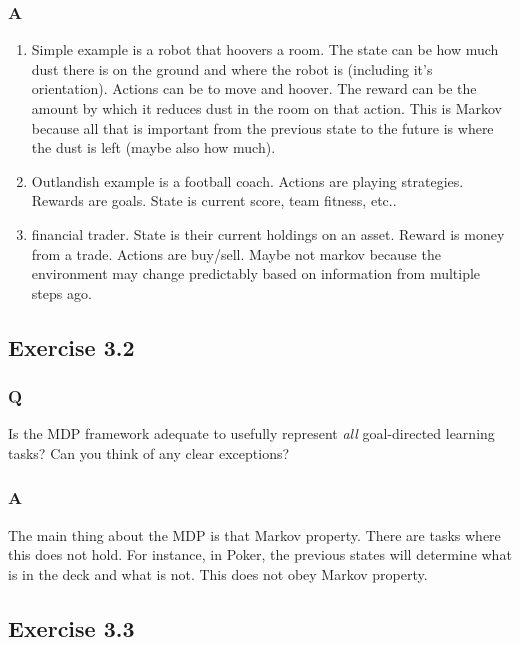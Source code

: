 \subsubsection{A}
\begin{enumerate}
    \item Simple example is a robot that hoovers a room. The state can be how much dust there is on the ground and where the robot is (including it's orientation). Actions can be to move and hoover. The reward can be the amount by which it reduces dust in the room on that action. This is Markov because all that is important from the previous state to the future is where the dust is left (maybe also how much).
    \item Outlandish example is a football coach. Actions are playing strategies. Rewards are goals. State is current score, team fitness, etc..
    \item financial trader. State is their current holdings on an asset. Reward is money from a trade. Actions are buy/sell. Maybe not markov because the environment may change predictably based on information from multiple steps ago.
\end{enumerate}

\subsection{Exercise 3.2}
\subsubsection{Q}
Is the MDP framework adequate to usefully represent \emph{all} goal-directed learning tasks? Can you think of any clear exceptions?

\subsubsection{A}
The main thing about the MDP is that Markov property. There are tasks where this does not hold. For instance, in Poker, the previous states will determine what is in the deck and what is not. This does not obey Markov property.

\subsection{Exercise 3.3}
